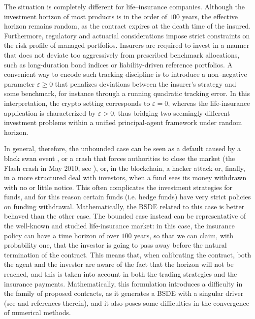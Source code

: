 \documentclass[11pt,a4paper]{article}
\theoremstyle{thmstyleone}%
\theoremstyle{thmstyletwo}%
\theoremstyle{thmstylethree}%
\begin{document}
The situation is completely different for life–insurance companies. Although the investment horizon of most products is in the order of $100$ years, the effective horizon remains random, as the contract expires at the death time of the insured. Furthermore, regulatory and actuarial considerations impose strict constraints on the risk profile of managed portfolios. Insurers are required to invest in a manner that does not deviate too aggressively from prescribed benchmark allocations, such as long-duration bond indices or liability-driven reference portfolios.  
A convenient way to encode such tracking discipline is to introduce a non–negative parameter $\varepsilon \ge 0$ that penalizes deviations between the insurer's strategy and some benchmark, for instance through a running quadratic tracking error.  
In this interpretation, the crypto setting corresponds to $\varepsilon=0$,
whereas the life-insurance application is characterized by $\varepsilon>0$, thus bridging two seemingly different investment problems within a unified principal-agent framework under random horizon.


In general, therefore, the unbounded case can be seen as a default caused by a black swan event \cite{pate2012black}, or a crash that forces authorities to close the market (the Flash crash in May 2010, see \cite{kirilenko2017flash}), or, in the blockchain, a hacker attack or, finally, in a more structured deal with investors, when a fund sees its money withdrawn with no or little notice. This often complicates the investment strategies for funds, and for this reason certain funds (i.e. hedge funds) have very strict policies on funding withdrawal. Mathematically, the BSDE related to this case is better behaved than the other case. The bounded case instead can be representative of the well-known and studied life-insurance market: in this case, the insurance policy can have a time horizon of over $100$ years, so that we can claim, with probability one, that the investor is going to pass away before the natural termination of the contract. This means that, when calibrating the contract, both the agent and the investor are aware of the fact that the horizon will not be reached, and this is taken into account in both the trading strategies and the insurance payments. Mathematically, this formulation introduces a difficulty in the family of proposed contracts, as it generates a BSDE with a singular driver (see \cite{jeanblanc2015utility} and references therein), and it also poses some difficulties in the convergence of numerical methods.\\
\end{document}
